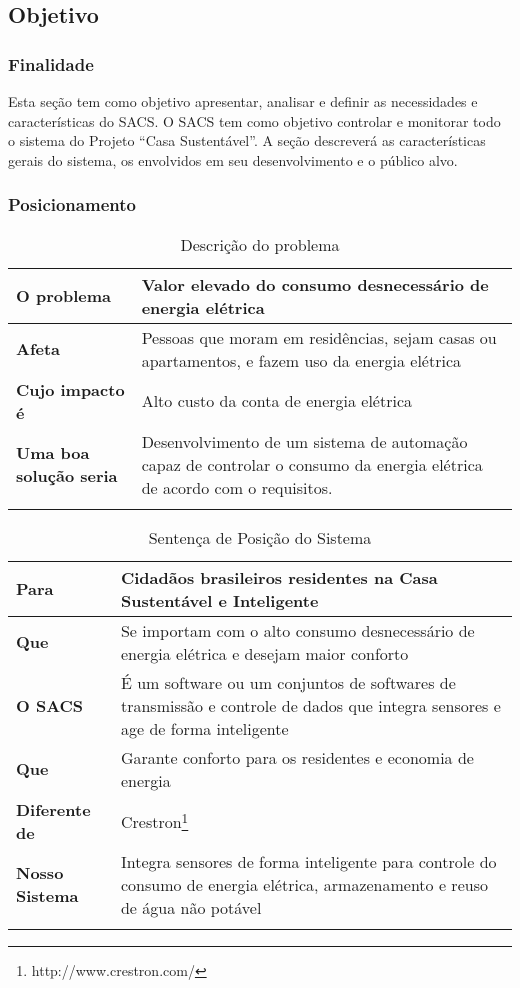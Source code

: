 \subsection{Objetivo}
\label{subsec:objetivo}

\subsubsection{Finalidade}

	Esta seção tem como objetivo apresentar, analisar e definir as necessidades e características do SACS. O
	SACS tem como objetivo controlar e monitorar todo o sistema do Projeto “Casa Sustentável”. A seção
	descreverá as características gerais do sistema, os envolvidos em seu desenvolvimento e o público alvo.

\subsubsection{Posicionamento}


\begin{longtable}{|l|m{7cm}|}
	\hline \textbf{O problema} & Valor elevado do consumo desnecessário de energia elétrica\\
	\hline \textbf{Afeta} & Pessoas que moram em residências, sejam casas ou apartamentos, e fazem uso da energia
	elétrica\\
	\hline \textbf{Cujo impacto é} & Alto custo da conta de energia elétrica\\
	\hline \textbf{Uma boa solução seria} & Desenvolvimento de um sistema de automação capaz de controlar o consumo
	da energia elétrica de acordo com o requisitos.\\
	\hline
\caption{Descrição do problema}
\label{Descrição_do_problema}
\end{longtable}


\begin{longtable}{|l|m{7cm}|}
	\hline \textbf{Para} & Cidadãos brasileiros residentes na Casa Sustentável e Inteligente \\
	\hline \textbf{Que} & Se importam com o alto consumo desnecessário de energia elétrica e desejam maior conforto\\
	\hline \textbf{O SACS} & É um software ou um conjuntos de softwares de transmissão e controle de dados que
	integra sensores e age de forma inteligente\\
	\hline \textbf{Que} & Garante conforto para os residentes e economia de energia\\
	\hline \textbf{Diferente de} & Crestron\footnote{http://www.crestron.com/}\\
	\hline \textbf{Nosso Sistema} & Integra sensores de forma inteligente para controle do consumo de energia elétrica,
	armazenamento e reuso de água não potável\\
	\hline
\caption{Sentença de Posição do Sistema}
\label{Sentenca_de_Posicao_do_Sistema}
\end{longtable}

